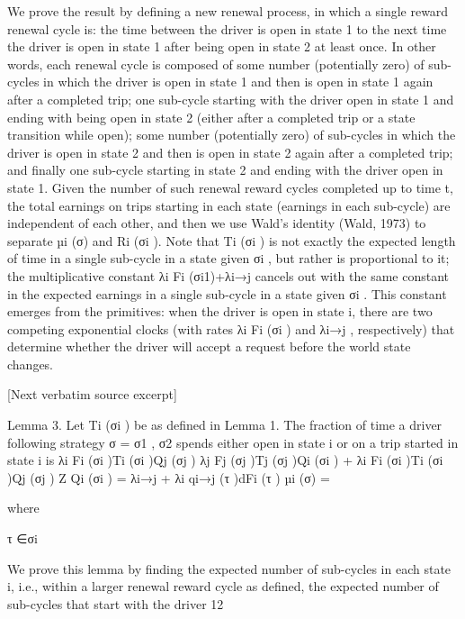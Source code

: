 \documentclass[10pt]{article}
\begin{document}
\begin{ReviewVerbatim}
We prove the result by defining a new renewal process, in which a single reward renewal cycle
is: the time between the driver is open in state 1 to the next time the driver is open in state 1
after being open in state 2 at least once. In other words, each renewal cycle is composed of some
number (potentially zero) of sub-cycles in which the driver is open in state 1 and then is open in
state 1 again after a completed trip; one sub-cycle starting with the driver open in state 1 and
ending with being open in state 2 (either after a completed trip or a state transition while open);
some number (potentially zero) of sub-cycles in which the driver is open in state 2 and then is open
in state 2 again after a completed trip; and finally one sub-cycle starting in state 2 and ending with
the driver open in state 1.
Given the number of such renewal reward cycles completed up to time t, the total earnings on
trips starting in each state (earnings in each sub-cycle) are independent of each other, and then we
use Wald’s identity (Wald, 1973) to separate µi (σ) and Ri (σi ).
Note that Ti (σi ) is not exactly the expected length of time in a single sub-cycle in a state
given σi , but rather is proportional to it; the multiplicative constant λi Fi (σi1)+λi→j cancels out with
the same constant in the expected earnings in a single sub-cycle in a state given σi . This constant
emerges from the primitives: when the driver is open in state i, there are two competing exponential
clocks (with rates λi Fi (σi ) and λi→j , respectively) that determine whether the driver will accept a
request before the world state changes.

[Next verbatim source excerpt]

Lemma 3. Let Ti (σi ) be as defined in Lemma 1. The fraction of time a driver following strategy
σ = {σ1 , σ2 } spends either open in state i or on a trip started in state i is
λi Fi (σi )Ti (σi )Qj (σj )
λj Fj (σj )Tj (σj )Qi (σi ) + λi Fi (σi )Ti (σi )Qj (σj )
Z
Qi (σi ) = λi→j + λi
qi→j (τ )dFi (τ )
µi (σ) =

where

τ ∈σi

We prove this lemma by finding the expected number of sub-cycles in each state i, i.e., within a
larger renewal reward cycle as defined, the expected number of sub-cycles that start with the driver
12



\end{ReviewVerbatim}
\end{document}
